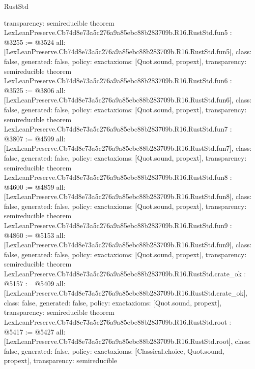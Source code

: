 \begin{lexlean}{RustStd}
\begin{coremodule}
{  transparency: semireducible
}
theorem LexLeanPreserve.Cb74d8e73a5c276a9a85ebc88b283709b.R16.RustStd.fun5 : @3255 := @3524 {
  all: [LexLeanPreserve.Cb74d8e73a5c276a9a85ebc88b283709b.R16.RustStd.fun5],
  class: false,
  generated: false,
  policy: exact{axioms: [Quot.sound, propext]},
  transparency: semireducible
}
theorem LexLeanPreserve.Cb74d8e73a5c276a9a85ebc88b283709b.R16.RustStd.fun6 : @3525 := @3806 {
  all: [LexLeanPreserve.Cb74d8e73a5c276a9a85ebc88b283709b.R16.RustStd.fun6],
  class: false,
  generated: false,
  policy: exact{axioms: [Quot.sound, propext]},
  transparency: semireducible
}
theorem LexLeanPreserve.Cb74d8e73a5c276a9a85ebc88b283709b.R16.RustStd.fun7 : @3807 := @4599 {
  all: [LexLeanPreserve.Cb74d8e73a5c276a9a85ebc88b283709b.R16.RustStd.fun7],
  class: false,
  generated: false,
  policy: exact{axioms: [Quot.sound, propext]},
  transparency: semireducible
}
theorem LexLeanPreserve.Cb74d8e73a5c276a9a85ebc88b283709b.R16.RustStd.fun8 : @4600 := @4859 {
  all: [LexLeanPreserve.Cb74d8e73a5c276a9a85ebc88b283709b.R16.RustStd.fun8],
  class: false,
  generated: false,
  policy: exact{axioms: [Quot.sound, propext]},
  transparency: semireducible
}
theorem LexLeanPreserve.Cb74d8e73a5c276a9a85ebc88b283709b.R16.RustStd.fun9 : @4860 := @5153 {
  all: [LexLeanPreserve.Cb74d8e73a5c276a9a85ebc88b283709b.R16.RustStd.fun9],
  class: false,
  generated: false,
  policy: exact{axioms: [Quot.sound, propext]},
  transparency: semireducible
}
theorem LexLeanPreserve.Cb74d8e73a5c276a9a85ebc88b283709b.R16.RustStd.crate_ok : @5157 := @5409 {
  all: [LexLeanPreserve.Cb74d8e73a5c276a9a85ebc88b283709b.R16.RustStd.crate_ok],
  class: false,
  generated: false,
  policy: exact{axioms: [Quot.sound, propext]},
  transparency: semireducible
}
theorem LexLeanPreserve.Cb74d8e73a5c276a9a85ebc88b283709b.R16.RustStd.root : @5417 := @5427 {
  all: [LexLeanPreserve.Cb74d8e73a5c276a9a85ebc88b283709b.R16.RustStd.root],
  class: false,
  generated: false,
  policy: exact{axioms: [Classical.choice, Quot.sound, propext]},
  transparency: semireducible
}


\end{coremodule}
\end{lexlean}
